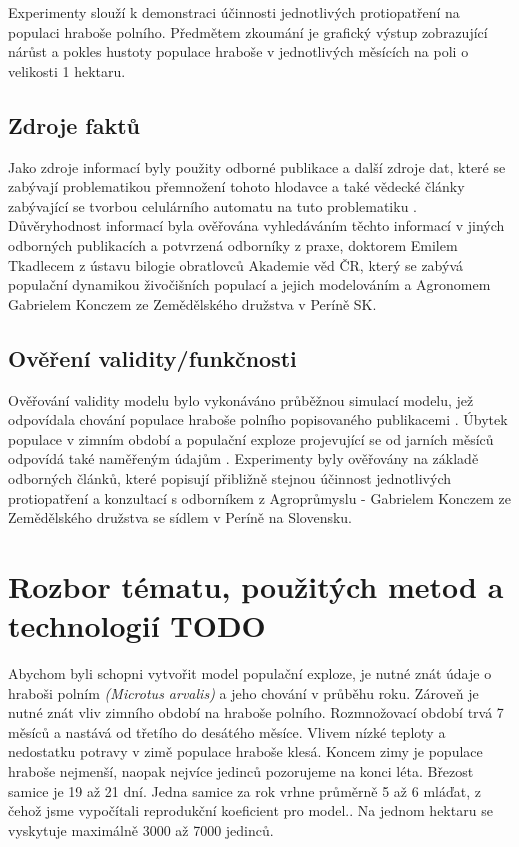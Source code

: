 \documentclass[a4paper,11pt]{article}
\begin{document}
Experimenty slouží k demonstraci účinnosti jednotlivých protiopatření na populaci hraboše polního. Předmětem zkoumání je grafický výstup zobrazující nárůst  a  pokles hustoty populace hraboše v jednotlivých měsících na poli o velikosti 1 hektaru. 

\subsection{Zdroje faktů}
Jako zdroje informací byly použity odborné publikace\cite{prubehvyvoje} a další zdroje dat\cite{letak}, které se zabývají problematikou přemnožení tohoto hlodavce a také vědecké články zabývající se tvorbou celulárního automatu na tuto problematiku \cite{OurCA}. Důvěryhodnost informací byla ověřována vyhledáváním těchto informací v jiných odborných publikacích \cite{fluktuace} \cite{prubehvyvoje} a potvrzená odborníky z praxe, doktorem Emilem Tkadlecem z ústavu bilogie obratlovců Akademie věd ČR, který se zabývá populační dynamikou živočišních populací a jejich modelováním a Agronomem Gabrielem Konczem ze Zemědělského družstva v Períně SK.

\subsection{Ověření validity/funkčnosti}
Ověřování validity modelu bylo vykonáváno průběžnou simulací modelu, jež odpovídala chování populace hraboše polního popisovaného publikacemi \cite{letak}\cite{fluktuace}\cite{prubehvyvoje}\cite{Voles-popul-data:online}\cite{diplom-Tkadlec}. Úbytek populace v zimním období a populační exploze projevující se od jarních měsíců odpovídá také naměřeným údajům \cite{Winter-temp:online}. Experimenty byly ověřovány na základě odborných článků, které popisují přibližně stejnou účinnost jednotlivých protiopatření a konzultací s odborníkem z Agroprůmyslu - Gabrielem Konczem ze Zemědělského družstva se sídlem v Períně na Slovensku.   

\section{Rozbor tématu, použitých metod a technologií TODO}
Abychom byli schopni vytvořit model populační exploze, je nutné znát údaje o hraboši polním \textit{(Microtus arvalis)} a jeho chování v průběhu roku.
 Zároveň je nutné znát vliv zimního období na hraboše polního. Rozmnožovací období trvá 7 měsíců a nastává od třetího do desátého měsíce.\cite{diplom-Tkadlec} Vlivem nízké teploty a nedostatku potravy v zimě populace hraboše klesá. Koncem zimy je populace hraboše nejmenší, naopak nejvíce jedinců pozorujeme na konci léta.\cite{Winter-temp:online} Březost samice je 19 až 21 dní. Jedna samice za rok vrhne průměrně 5 až 6 mláďat\cite{diplom-Tkadlec}, z čehož jsme vypočítali reprodukční koeficient pro model.\cite{OurCA}. Na jednom hektaru se vyskytuje maximálně 3000 až 7000 jedinců. \cite{hustoty}
\end{document}

